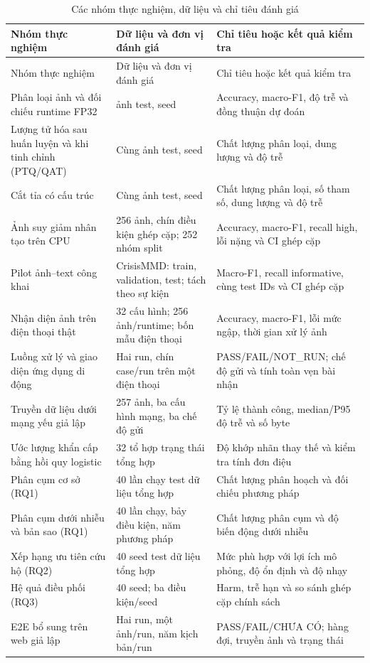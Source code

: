 \begin{longtable}{P{.28\textwidth}P{.30\textwidth}P{.31\textwidth}}
\caption{Các nhóm thực nghiệm, dữ liệu và chỉ tiêu đánh giá}\label{tab:experiment-map}\\
\toprule Nhóm thực nghiệm & Dữ liệu và đơn vị đánh giá & Chỉ tiêu hoặc kết quả kiểm tra \\\midrule\endfirsthead
\toprule Nhóm thực nghiệm & Dữ liệu và đơn vị đánh giá & Chỉ tiêu hoặc kết quả kiểm tra \\\midrule\endhead
Phân loại ảnh và đối chiếu runtime FP32 & \ImageTest{} ảnh test, seed \BenchmarkSeed{} & Accuracy, macro-F1, độ trễ và đồng thuận dự đoán \\
Lượng tử hóa sau huấn luyện và khi tinh chỉnh (PTQ/QAT) & Cùng \ImageTest{} ảnh test, seed \QuantizationSeed{} & Chất lượng phân loại, dung lượng và độ trễ \\
Cắt tỉa có cấu trúc & Cùng \ImageTest{} ảnh test, seed \PruningSeed{} & Chất lượng phân loại, số tham số, dung lượng và độ trễ \\
Ảnh suy giảm nhân tạo trên CPU & 256 ảnh, chín điều kiện ghép cặp; 252 nhóm split & Accuracy, macro-F1, recall high, lỗi nặng và CI ghép cặp \\
Pilot ảnh--text công khai & CrisisMMD: \MMTrainN{} train, \MMDevN{} validation, \MMTestN{} test; tách theo sự kiện & Macro-F1, recall informative, cùng test IDs và CI ghép cặp \\
Nhận diện ảnh trên điện thoại thật & 32 cấu hình; 256 ảnh/runtime; bốn mẫu điện thoại & Accuracy, macro-F1, lỗi mức ngập, thời gian xử lý ảnh \\
Luồng xử lý và giao diện ứng dụng di động & Hai run, chín case/run trên một điện thoại & PASS/FAIL/NOT\_RUN; chế độ gửi và tính toàn vẹn bài nhận \\
Truyền dữ liệu dưới mạng yếu giả lập & 257 ảnh, ba cấu hình mạng, ba chế độ gửi & Tỷ lệ thành công, median/P95 độ trễ và số byte \\
Ước lượng khẩn cấp bằng hồi quy logistic & 32 tổ hợp trạng thái tổng hợp & Độ khớp nhãn thay thế và kiểm tra tính đơn điệu \\
Phân cụm cơ sở (RQ1) & 40 lần chạy test dữ liệu tổng hợp & Chất lượng phân hoạch và đối chiếu phương pháp \\
Phân cụm dưới nhiễu và bản sao (RQ1) & 40 lần chạy, bảy điều kiện, năm phương pháp & Chất lượng phân cụm và độ biến động dưới nhiễu \\
Xếp hạng ưu tiên cứu hộ (RQ2) & 40 seed test dữ liệu tổng hợp & Mức phù hợp với lợi ích mô phỏng, độ ổn định và độ nhạy \\
Hệ quả điều phối (RQ3) & 40 seed; ba điều kiện/seed & Harm, trễ hạn và so sánh ghép cặp chính sách \\
E2E bổ sung trên web giả lập & Hai run, một ảnh/run, năm kịch bản/run & PASS/FAIL/CHƯA CÓ; hàng đợi, truyền ảnh và trạng thái \\
\bottomrule
\end{longtable}

